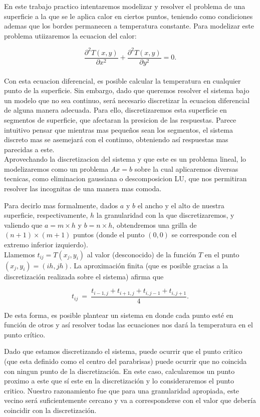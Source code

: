 En este trabajo practico intentaremos modelizar y resolver el problema de una superficie a la que se le aplica calor en ciertos puntos, teniendo como condiciones ademas que los bordes permanecen a temperatura constante. Para modelizar este problema utiizaremos la ecuacion del calor:

\begin{equation}
\frac{\partial^2T(x,y)}{\partial x^{2}}+\frac{\partial^2 T(x,y)}{\partial y^{2}} = 0.
\end{equation}\\

Con esta ecuacion diferencial, es posible calcular la temperatura en cualquier punto de la superficie. Sin embargo, dado que queremos resolver el sistema bajo un modelo que no sea continuo, ser\'a necesario discretizar la ecuacion diferencial de alguna manera adecuada. Para ello, discretizaremos esta superficie en segmentos de superficie, que afectaran la presicion de las respuestas. Parece intuitivo pensar que mientras mas pequeños sean los segmentos, el sistema discreto mas se asemejar\'a con el continuo, obteniendo as\'i respuestas mas parecidas a este.\\

Aprovechando la discretizacion del sistema y que este es un problema lineal, lo modelizaremos como un problema $Ax=b$ sobre la cual aplicaremos diversas tecnicas, como eliminacion gaussiana o descomposicion LU, que nos permitiran resolver las incognitas de una manera mas comoda.

Para decirlo mas formalmente, dados $a$ y $b$ el ancho y el alto de nuestra superficie, respectivamente, $h$ la granularidad con la que discretizaremos, y valiendo que  $a = m\times h$ y $b = n \times h$, obtendremos una grilla de $(n+1)\times(m+1)$ puntos (donde el punto $(0,0)$ se corresponde con el extremo inferior izquierdo).\\

Llamemos $t_{ij} = T(x_j,y_i)$ al valor (desconocido) de la funci\'on $T$ en el punto $(x_j, y_i) = (ih, jh)$. La aproximaci\'on finita (que es posible gracias a la discretizaci\'on realizada sobre el sistema) afirma que

\begin{equation}
t_{ij} \ =\ \frac{ t_{i-1,j} + t_{i+1,j} + t_{i,j-1} + t_{i,j+1}}{4}.
\end{equation}

De esta forma, es posible plantear un sistema en donde cada punto est\'e en funci\'on de otros y as\'i resolver todas las ecuaciones nos dar\'a la temperatura en el punto cr\'itico.

Dado que estamos discretizando el sistema, puede ocurrir que el punto critico (que esta definido como el centro del parabrisas) puede ocurrir que no coincida con ningun punto de la discretización. En este caso, calcularemos un punto proximo a este que sí este en la discretización y lo consideraremos el punto critico. Nuestro razonamiento fue que para una granularidad apropiada, este vecino será suficientemente cercano y va a corresponderse con el valor que debería coincidir con la discretización.